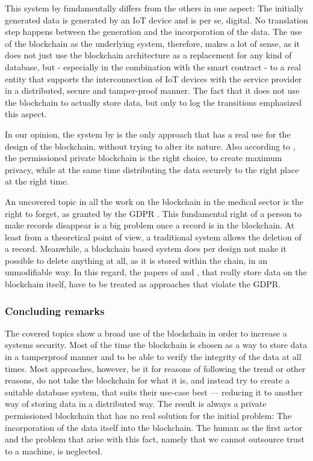 This system by \cite{Baccarini2018} fundamentally differs from the others in one aspect: The initially generated data is generated by an IoT device and is per se, digital. No translation step happens between the generation and the incorporation of the data.
The use of the blockchain as the underlying system, therefore, makes a lot of sense, as it does not just use the blockchain architecture as a replacement for any kind of database, but - especially in the combination with the smart contract - to a real entity that supports the interconnection of IoT devices with the service provider in a distributed, secure and tamper-proof manner. The fact that it does not use the blockchain to actually store data, but only to log the transitions emphasized this aspect.

In our opinion, the system by \citeauthor{Baccarini2018} is the only approach that has a real use for the design of the blockchain, without trying to alter its nature. Also according to \citeauthor{Wust2017}, the permissioned private blockchain is the right choice, to create maximum privacy, while at the same time distributing the data securely to the right place at the right time.

An uncovered topic in all the work on the blockchain in the medical sector is the right to forget, as granted by the GDPR \cite{EuropeanCommission2017}. This fundamental right of a person to make records disappear is a big problem once a record is in the blockchain. At least from a theoretical point of view, a traditional system allows the deletion of a record. Meanwhile, a blockchain based system does per design not make it possible to delete anything at all, as it is stored within the chain, in an unmodifiable way. In this regard, the papers of \cite{Cao2019} and \cite{Azaria2016}, that really store data on the blockchain itself, have to be treated as approaches that violate the GDPR.

\subsubsection{Concluding remarks}
The covered topics show a broad use of the blockchain in order to increase a systems security. Most of the time the blockchain is chosen as a way to store data in a tamperproof manner and to be able to verify the integrity of the data at all times.
Most approaches, however, be it for reasons of following the trend or other reasons, do not take the blockchain for what it is, and instead try to create a suitable database system, that suits their use-case best — reducing it to another way of storing data in a distributed way. The result is always a private permissioned blockchain that has no real solution for the initial problem: The incorporation of the data itself into the blockchain. The human as the first actor and the problem that arise with this fact, namely that we cannot outsource trust to a machine, is neglected.

